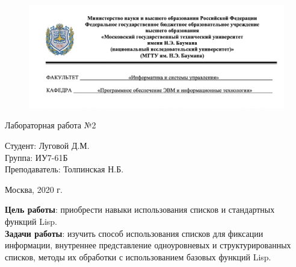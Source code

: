 


	
\begin{figure}[h!]
	\begin{center}
		{\includegraphics[width = \textwidth]{titul.png}}
	\end{center}
\end{figure}

\vspace*{20mm}

\huge
\begin{center}
	Лабораторная работа №2
\end{center}


\vspace*{50mm}

\large
\begin{flushleft}
	Студент: Луговой Д.М. \\
	Группа: ИУ7-61Б \\
	Преподаватель: Толпинская Н.Б.
\end{flushleft}

\vspace*{60mm}

\large
\begin{center}
	Москва, 2020 г.
\end{center}

\thispagestyle{empty}

\newpage
\vspace*{10mm}
\textbf{Цель работы}: приобрести навыки использования списков и стандартных функций Lisp.\\

\textbf{Задачи работы}: изучить способ использования списков для фиксации информации, внутреннее представление одноуровневых и структурированных списков, методы их обработки с использованием базовых функций Lisp.

